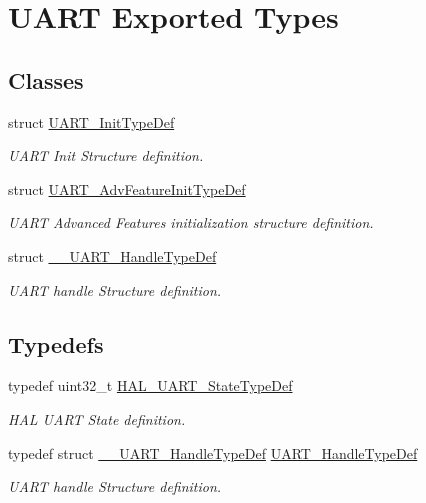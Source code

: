 \hypertarget{group___u_a_r_t___exported___types}{}\section{U\+A\+RT Exported Types}
\label{group___u_a_r_t___exported___types}
\subsection*{Classes}
\begin{DoxyCompactItemize}
\item 
struct \mbox{\hyperlink{struct_u_a_r_t___init_type_def}{U\+A\+R\+T\+\_\+\+Init\+Type\+Def}}
\begin{DoxyCompactList}\small\item\em U\+A\+RT Init Structure definition. \end{DoxyCompactList}\item 
struct \mbox{\hyperlink{struct_u_a_r_t___adv_feature_init_type_def}{U\+A\+R\+T\+\_\+\+Adv\+Feature\+Init\+Type\+Def}}
\begin{DoxyCompactList}\small\item\em U\+A\+RT Advanced Features initialization structure definition. \end{DoxyCompactList}\item 
struct \mbox{\hyperlink{struct_____u_a_r_t___handle_type_def}{\+\_\+\+\_\+\+U\+A\+R\+T\+\_\+\+Handle\+Type\+Def}}
\begin{DoxyCompactList}\small\item\em U\+A\+RT handle Structure definition. \end{DoxyCompactList}\end{DoxyCompactItemize}
\subsection*{Typedefs}
\begin{DoxyCompactItemize}
\item 
typedef uint32\+\_\+t \mbox{\hyperlink{group___u_a_r_t___exported___types_ga94c58ae1f4dbcf6032224edfc93a6e19}{H\+A\+L\+\_\+\+U\+A\+R\+T\+\_\+\+State\+Type\+Def}}
\begin{DoxyCompactList}\small\item\em H\+AL U\+A\+RT State definition. \end{DoxyCompactList}\item 
\mbox{\label{group___u_a_r_t___exported___types_ga7adf4f3e4c3ecde572be5925c915a967}} 
typedef struct \mbox{\hyperlink{struct_____u_a_r_t___handle_type_def}{\+\_\+\+\_\+\+U\+A\+R\+T\+\_\+\+Handle\+Type\+Def}} \mbox{\hyperlink{group___u_a_r_t___exported___types_ga7adf4f3e4c3ecde572be5925c915a967}{U\+A\+R\+T\+\_\+\+Handle\+Type\+Def}}
\begin{DoxyCompactList}\small\item\em U\+A\+RT handle Structure definition. \end{DoxyCompactList}\end{DoxyCompactItemize}
